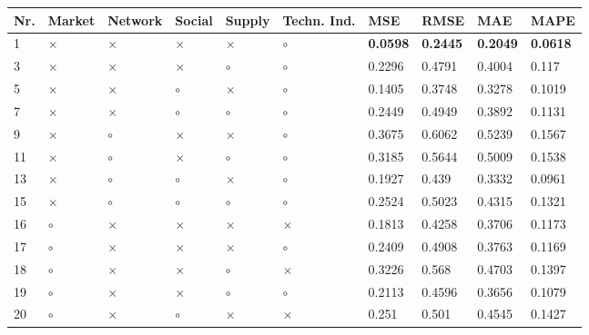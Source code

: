 \begin{table}[H]
\centering
\begin{tabular}{|P{0.7cm}|P{1.3cm}P{1.3cm}P{1.3cm}P{1.3cm}P{1.3cm}|P{1.1cm}P{1.1cm}P{1.1cm}P{1.1cm}|}
\hline
 Nr. &   Market &  Network &   Social &   Supply & Techn. Ind. &             MSE &            RMSE &             MAE &            MAPE \\
 & $\times$ & $\times$ & $\times$ & $\times$ &     $\circ$ & \textbf{0.0598} & \textbf{0.2445} & \textbf{0.2049} & \textbf{0.0618} \\
   3 & $\times$ & $\times$ & $\times$ &  $\circ$ &     $\circ$ &          0.2296 &          0.4791 &          0.4004 &           0.117 \\
   5 & $\times$ & $\times$ &  $\circ$ & $\times$ &     $\circ$ &          0.1405 &          0.3748 &          0.3278 &          0.1019 \\
   7 & $\times$ & $\times$ &  $\circ$ &  $\circ$ &     $\circ$ &          0.2449 &          0.4949 &          0.3892 &          0.1131 \\
   9 & $\times$ &  $\circ$ & $\times$ & $\times$ &     $\circ$ &          0.3675 &          0.6062 &          0.5239 &          0.1567 \\
  11 & $\times$ &  $\circ$ & $\times$ &  $\circ$ &     $\circ$ &          0.3185 &          0.5644 &          0.5009 &          0.1538 \\
  13 & $\times$ &  $\circ$ &  $\circ$ & $\times$ &     $\circ$ &          0.1927 &           0.439 &          0.3332 &          0.0961 \\
  15 & $\times$ &  $\circ$ &  $\circ$ &  $\circ$ &     $\circ$ &          0.2524 &          0.5023 &          0.4315 &          0.1321 \\
  16 &  $\circ$ & $\times$ & $\times$ & $\times$ &    $\times$ &          0.1813 &          0.4258 &          0.3706 &          0.1173 \\
  17 &  $\circ$ & $\times$ & $\times$ & $\times$ &     $\circ$ &          0.2409 &          0.4908 &          0.3763 &          0.1169 \\
  18 &  $\circ$ & $\times$ & $\times$ &  $\circ$ &    $\times$ &          0.3226 &           0.568 &          0.4703 &          0.1397 \\
  19 &  $\circ$ & $\times$ & $\times$ &  $\circ$ &     $\circ$ &          0.2113 &          0.4596 &          0.3656 &          0.1079 \\
  20 &  $\circ$ & $\times$ &  $\circ$ & $\times$ &    $\times$ &           0.251 &           0.501 &          0.4545 &          0.1427 \\

\end{tabular}
\end{table}
